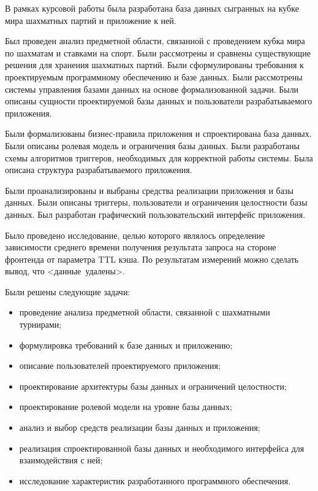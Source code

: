 
В рамках курсовой работы была разработана база данных сыгранных на кубке мира шахматных партий и приложение к ней.

Был проведен анализ предметной области, связанной с проведением кубка мира по шахматам и ставками на спорт. Были рассмотрены и сравнены существующие решения для хранения шахматных партий. Были сформулированы требования к проектируемым программному обеспечению и базе данных. Были рассмотрены системы управления базами данных на основе формализованной задачи. Были описаны сущности проектируемой базы данных и пользователи разрабатываемого приложения.

Были формализованы бизнес-правила приложения и спроектирована база данных. Были описаны ролевая модель и ограничения базы данных. Были разработаны схемы алгоритмов триггеров, необходимых для корректной работы системы. Была описана структура разрабатываемого приложения.

Были проанализированы и выбраны средства реализации приложения и базы данных. Были описаны триггеры, пользователи и ограничения целостности базы данных. Был разработан графический пользовательский интерфейс приложения.

Было проведено исследование, целью которого являлось определение зависимости среднего времени получения результата запроса на стороне фронтенда от параметра TTL кэша. По результатам измерений можно сделать вывод, что <данные~удалены>.

Были решены следующие задачи:
\begin{itemize}
	\item проведение анализа предметной области, связанной с шахматными турнирами;
	\item формулировка требований к базе данных и приложению;
	\item описание пользователей проектируемого приложения;
	\item проектирование архитектуры базы данных и ограничений целостности;
	\item проектирование ролевой модели на уровне базы данных;
	\item анализ и выбор средств реализации базы данных и приложения;
	\item реализация спроектированной базы данных и необходимого интерфейса для взаимодействия с ней;
	\item исследование характеристик разработанного программного обеспечения.
\end{itemize}
